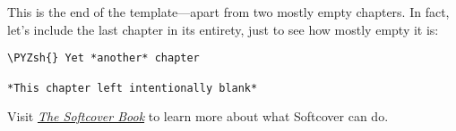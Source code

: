 This is the end of the template---apart from two mostly empty chapters. In fact, let’s include the last chapter in its entirety, just to see how mostly empty it is:
\begin{framed_shaded}
\begin{Verbatim}[fontsize=\relsize{-2.5},fontseries=b,commandchars=\\\{\}]
\PYZsh{} Yet *another* chapter

*This chapter left intentionally blank*
\end{Verbatim}
\end{framed_shaded}

Visit \href{http://manual.softcover.io}{\emph{The Softcover Book}} to learn more about what Softcover can do.